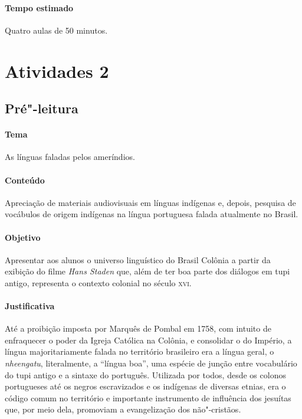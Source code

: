 \documentclass[12pt]{extarticle}
\begin{document}
{\paragraph{Tempo estimado} Quatro aulas de 50 minutos.




\section{Atividades 2}




\subsection{Pré"-leitura}

\paragraph{Tema} As línguas faladas pelos ameríndios. 

\paragraph{Conteúdo} Apreciação de materiais audiovisuais em línguas
indígenas e, depois, pesquisa de vocábulos de origem indígenas na língua
portuguesa falada atualmente no Brasil.

\paragraph{Objetivo} Apresentar aos alunos o universo linguístico do Brasil
Colônia a partir da exibição do filme \emph{Hans Staden} que, além de 
ter boa parte dos diálogos em tupi antigo, representa o contexto colonial
no século \textsc{xvi}.

\paragraph{Justificativa} Até a proibição imposta por Marquês de Pombal
em 1758, com intuito de enfraquecer o poder da Igreja Católica na Colônia,
e consolidar o do Império, a língua majoritariamente falada no território 
brasileiro era a língua geral, o \emph{nheengatu}, literalmente, a 
``língua boa'', uma espécie de junção entre vocabulário do tupi antigo e 
a sintaxe do português. Utilizada por todos, desde os colonos portugueses 
até os negros escravizados e os indígenas de diversas etnias, era o
código comum no território e importante instrumento de influência dos
jesuítas que, por meio dela, promoviam a evangelização dos não"-cristãos.

}
\end{document}
